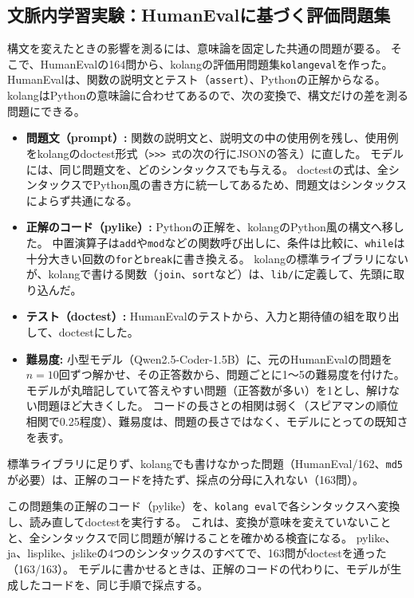 \documentclass{ipsjprosym}
\begin{document}
\subsection{文脈内学習実験：HumanEvalに基づく評価問題集}

構文を変えたときの影響を測るには、意味論を固定した共通の問題が要る。
そこで、HumanEval\cite{Chen2021HumanEval}の164問から、kolangの評価用問題集\verb|kolangeval|を作った。
HumanEvalは、関数の説明文とテスト（\verb|assert|）、Pythonの正解からなる。
kolangはPythonの意味論に合わせてあるので、次の変換で、構文だけの差を測る問題にできる。
\begin{itemize}
  \item \textbf{問題文（prompt）:} 関数の説明文と、説明文の中の使用例を残し、使用例をkolangのdoctest形式（\verb|>>> 式|の次の行にJSONの答え）に直した。
    モデルには、同じ問題文を、どのシンタックスでも与える。
    doctestの式は、全シンタックスでPython風の書き方に統一してあるため、問題文はシンタックスによらず共通になる。
  \item \textbf{正解のコード（pylike）:} Pythonの正解を、kolangのPython風の構文へ移した。
    中置演算子は\verb|add|や\verb|mod|などの関数呼び出しに、条件は比較に、\verb|while|は十分大きい回数の\verb|for|と\verb|break|に書き換える。
    kolangの標準ライブラリにないが、kolangで書ける関数（\verb|join|、\verb|sort|など）は、\verb|lib/|に定義して、先頭に取り込んだ。
  \item \textbf{テスト（doctest）:} HumanEvalのテストから、入力と期待値の組を取り出して、doctestにした。
  \item \textbf{難易度:} 小型モデル（Qwen2.5-Coder-1.5B）に、元のHumanEvalの問題を$n=10$回ずつ解かせ、その正答数から、問題ごとに1〜5の難易度を付けた。
    モデルが丸暗記していて答えやすい問題（正答数が多い）を1とし、解けない問題ほど大きくした。
    コードの長さとの相関は弱く（スピアマンの順位相関で0.25程度）、難易度は、問題の長さではなく、モデルにとっての既知さを表す。
\end{itemize}
標準ライブラリに足りず、kolangでも書けなかった問題（HumanEval/162、\verb|md5|が必要）は、正解のコードを持たず、採点の分母に入れない（163問）。

この問題集の正解のコード（pylike）を、\verb|kolang eval|で各シンタックスへ変換し、読み直してdoctestを実行する。
これは、変換が意味を変えていないことと、全シンタックスで同じ問題が解けることを確かめる検査になる。
pylike、ja、lisplike、jslikeの4つのシンタックスのすべてで、163問がdoctestを通った（163/163）。
モデルに書かせるときは、正解のコードの代わりに、モデルが生成したコードを、同じ手順で採点する。
\end{document}

